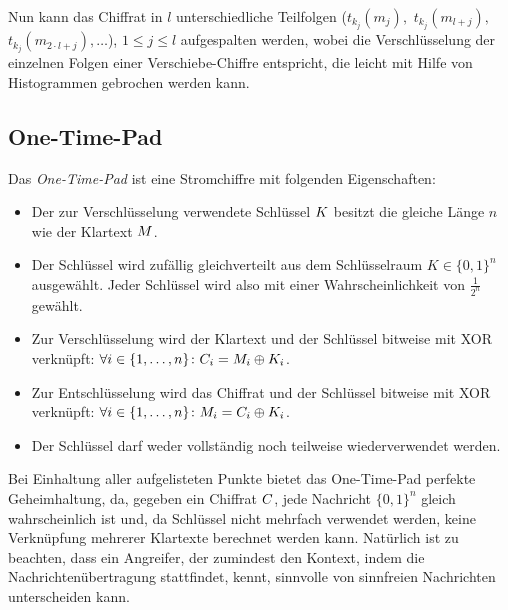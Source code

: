 Nun kann das Chiffrat in $l$ unterschiedliche Teilfolgen ($t_{k_j}(m_j),$ $t_{k_j}(m_{l+j}),$ $t_{k_j}(m_{2 \cdot l+j}),\ldots$), $1 \leq j \leq l$ aufgespalten werden, wobei die Verschlüsselung der einzelnen Folgen einer Verschiebe-Chiffre entspricht, die leicht mit Hilfe von Histogrammen gebrochen werden kann.

\subsection{One-Time-Pad}
\label{ssec:otp}
Das \emph{One-Time-Pad} \indexOTP ist eine Stromchiffre mit folgenden Eigenschaften:
\begin{itemize}
	\item Der zur Verschlüsselung verwendete Schlüssel $K$ besitzt die gleiche Länge $n$ wie der Klartext $M$.
	\item Der Schlüssel wird zufällig gleichverteilt aus dem Schlüsselraum $K \in \{0,1\}^{n}$ ausgewählt. Jeder Schlüssel wird also mit einer Wahrscheinlichkeit von $\frac{1}{2^{n}}$ gewählt.
 	\item Zur Verschlüsselung wird der Klartext und der Schlüssel bitweise mit XOR verknüpft: $\forall i \in \{1,\dots,n\}\colon C_i = M_i\oplus K_i$.
 	\item Zur Entschlüsselung wird das Chiffrat und der Schlüssel bitweise mit XOR verknüpft: $\forall i \in \{1,\dots,n\}\colon M_i = C_i\oplus K_i$.
  	\item Der Schlüssel darf weder vollständig noch teilweise wiederverwendet werden.
\end{itemize}
Bei Einhaltung aller aufgelisteten Punkte bietet das One-Time-Pad perfekte Geheimhaltung, da, gegeben ein Chiffrat $C$, jede Nachricht $\{0,1\}^{n}$ gleich wahrscheinlich ist und, da Schlüssel nicht mehrfach verwendet werden, keine Verknüpfung mehrerer Klartexte berechnet werden kann. Natürlich ist zu beachten, dass ein Angreifer, der zumindest den Kontext, indem die Nachrichtenübertragung stattfindet, kennt, sinnvolle von sinnfreien Nachrichten unterscheiden kann.

